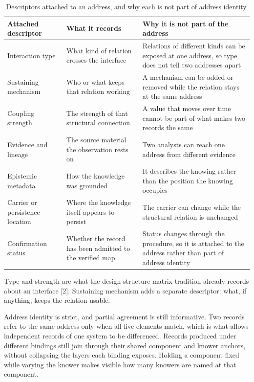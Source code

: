 \documentclass[conference]{IEEEtran}
\begin{document}
\begin{table}[!tb]
\caption{Descriptors attached to an address, and why each is not part of address identity.}
\label{tab:descriptors}
\centering
\scriptsize
\begin{tabularx}{\textwidth}{W{0.78}W{1.17}W{1.05}}
\hline
\textbf{Attached descriptor} & \textbf{What it records} & \textbf{Why it is not part of the address} \\
\hline
Interaction type & What kind of relation crosses the interface & Relations of different kinds can be exposed at one address, so type does not tell two addresses apart \\
Sustaining mechanism & Who or what keeps that relation working & A mechanism can be added or removed while the relation stays at the same address \\
Coupling strength & The strength of that structural connection & A value that moves over time cannot be part of what makes two records the same \\
Evidence and lineage & The source material the observation rests on & Two analysts can reach one address from different evidence \\
Epistemic metadata & How the knowledge was grounded & It describes the knowing rather than the position the knowing occupies \\
Carrier or persistence location & Where the knowledge itself appears to persist & The carrier can change while the structural relation is unchanged \\
Confirmation status & Whether the record has been admitted to the verified map & Status changes through the procedure, so it is attached to the address rather than part of address identity \\
\hline
\end{tabularx}
\end{table}

Type and strength are what the design structure matrix tradition already records about an interface [2]. Sustaining mechanism adds a separate descriptor: what, if anything, keeps the relation usable.

Address identity is strict, and partial agreement is still informative. Two records refer to the same address only when all five elements match, which is what allows independent records of one system to be differenced. Records produced under different bindings still join through their shared component and knower anchors, without collapsing the layers each binding exposes. Holding a component fixed while varying the knower makes visible how many knowers are named at that component.
\end{document}
